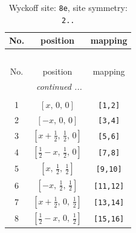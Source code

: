 \documentclass[fleqn,8pt]{jsarticle}
\begin{document}
\renewcommand{\arraystretch}{1.2}
\begin{longtable}{ccc}
\caption{Wyckoff site: {\tt 8e}, site symmetry: {\tt 2..}}
 \\
 \hline \hline
No. & position & mapping \\ \hline \endfirsthead

\multicolumn{2}{l}{\tablename\ \thetable{}} \\
 \hline \hline
No. & position & mapping \\ \hline \endhead

 \hline \hline
\multicolumn{2}{r}{\footnotesize\it continued ...} \\ \endfoot

 \hline \hline
\multicolumn{2}{r}{} \\ \endlastfoot

1 & $\left[ x,\, 0,\, 0 \right]$ & {\tt [1,2]} \\ \hline
2 & $\left[ - x,\, 0,\, 0 \right]$ & {\tt [3,4]} \\ \hline
3 & $\left[ x + \frac{1}{2},\, \frac{1}{2},\, 0 \right]$ & {\tt [5,6]} \\ \hline
4 & $\left[ \frac{1}{2} - x,\, \frac{1}{2},\, 0 \right]$ & {\tt [7,8]} \\ \hline
5 & $\left[ x,\, \frac{1}{2},\, \frac{1}{2} \right]$ & {\tt [9,10]} \\ \hline
6 & $\left[ - x,\, \frac{1}{2},\, \frac{1}{2} \right]$ & {\tt [11,12]} \\ \hline
7 & $\left[ x + \frac{1}{2},\, 0,\, \frac{1}{2} \right]$ & {\tt [13,14]} \\ \hline
8 & $\left[ \frac{1}{2} - x,\, 0,\, \frac{1}{2} \right]$ & {\tt [15,16]} \\
\end{longtable}
\renewcommand{\arraystretch}{1.2}
\end{document}
